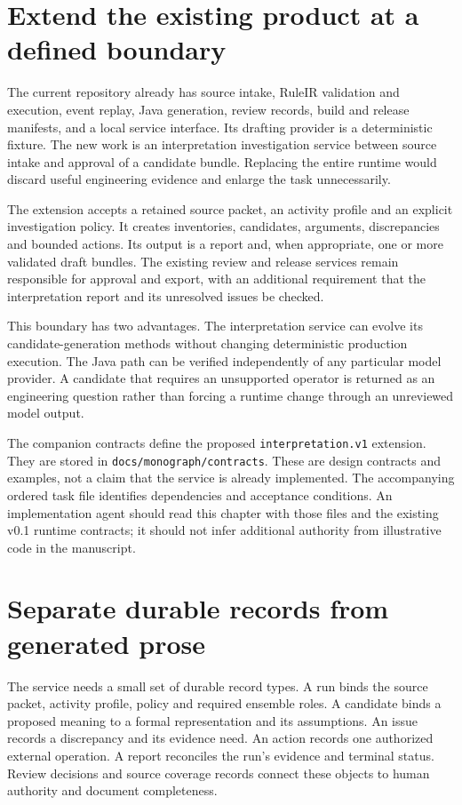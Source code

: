 \documentclass[12pt,a4paper,oneside,openany]{book}
\begin{document}
\section{Extend the existing product at a defined boundary}

The current repository already has source intake, RuleIR validation and execution,
event replay, Java generation, review records, build and release manifests, and a
local service interface. Its drafting provider is a deterministic fixture. The
new work is an interpretation investigation service between source intake and
approval of a candidate bundle. Replacing the entire runtime would discard useful
engineering evidence and enlarge the task unnecessarily.

The extension accepts a retained source packet, an activity profile and an
explicit investigation policy. It creates inventories, candidates, arguments,
discrepancies and bounded actions. Its output is a report and, when appropriate,
one or more validated draft bundles. The existing review and release services
remain responsible for approval and export, with an additional requirement that
the interpretation report and its unresolved issues be checked.

This boundary has two advantages. The interpretation service can evolve its
candidate-generation methods without changing deterministic production execution.
The Java path can be verified independently of any particular model provider.
A candidate that requires an unsupported operator is returned as an engineering
question rather than forcing a runtime change through an unreviewed model output.

The companion contracts define the proposed \texttt{interpretation.v1} extension.
They are stored in \texttt{docs/monograph/contracts}. These are design contracts
and examples, not
a claim that the service is already implemented. The accompanying ordered task file identifies dependencies and acceptance conditions. An
implementation agent should read this chapter with those files and the existing
v0.1 runtime contracts; it should not infer additional authority from illustrative
code in the manuscript.

\section{Separate durable records from generated prose}

The service needs a small set of durable record types. A run binds the source
packet, activity profile, policy and required ensemble roles. A candidate binds a
proposed meaning to a formal representation and its assumptions. An issue records
a discrepancy and its evidence need. An action records one authorized external
operation. A report reconciles the run's evidence and terminal status. Review
decisions and source coverage records connect these objects to human authority
and document completeness.
\end{document}
